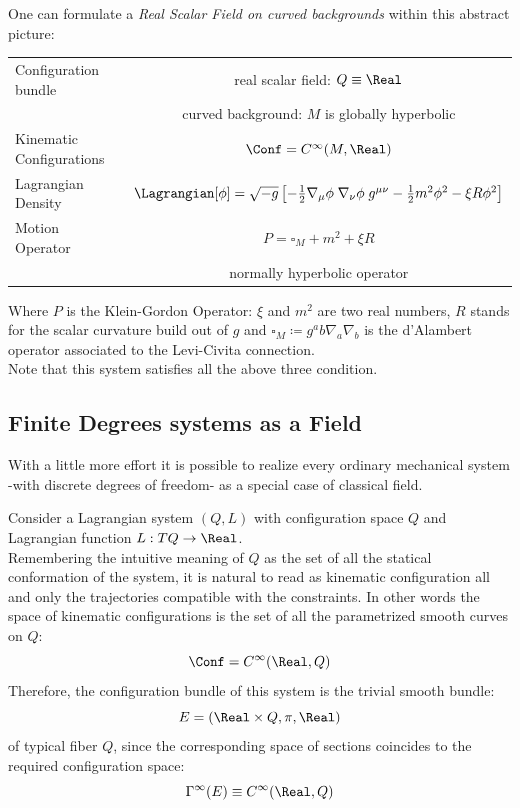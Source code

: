 \documentclass[Main]{subfiles}
\begin{document}
		\begin{example}
		One can formulate a \emph{Real Scalar Field on curved backgrounds} within this abstract picture:
			\begin{center}\begin{tabular}{|l|c|}
			\hline
			Configuration bundle & real scalar field: $Q \equiv \Real$\\
													& curved background: $M$ is globally hyperbolic\\
			\hline
			Kinematic Configurations & $\Conf = C^\infty(M,\Real)$\\
			\hline
			Lagrangian Density &  $\Lagrangian[\phi] = \sqrt{-g} \left[ -\frac{1}{2} \nabla_\mu \phi \; \nabla_\nu \phi \; g^{\mu \nu}  -\frac{1}{2}m^2 \phi^2 -\xi  R \phi^2\right]$ \\
			\hline
			Motion Operator			&  $P=\square_M + m^2 + \xi R$ \\
													& normally hyperbolic operator\\
			\hline
			\end{tabular}\end{center}
			Where $P$ is the Klein-Gordon Operator: $\xi$ and $m^2$ are two real numbers, $R$ stands for the scalar curvature build out of $g$ and $\square_M \coloneqq g^ab \nabla_a \nabla_b$ is the d'Alambert operator associated to the Levi-Civita connection.	
		\\
		Note that this system satisfies all the above three condition.
		\end{example}
	



		\subsection{Finite Degrees systems as a Field}\label{MechanicsAsAField}
			With a little more effort it is possible to realize every ordinary mechanical system  -with discrete degrees of freedom- as a special case of classical field.
			
			Consider a Lagrangian system $(Q, L)$ with configuration space $Q$ and Lagrangian function $L: TQ\rightarrow \Real$.
			\\
			Remembering the intuitive meaning of $Q$ as the set of all the statical conformation of the system, it is natural to read as kinematic configuration all and only the trajectories compatible with the constraints.
			In other words the space of kinematic configurations is the set of all the parametrized smooth curves on $Q$:
			\begin{displaymath}
				\Conf = C^\infty(\Real,Q)
			\end{displaymath}
			Therefore, the configuration bundle of this system is the trivial smooth bundle:
			\begin{displaymath}
				E= ( \Real\times Q, \pi, \Real)
			\end{displaymath}
			of typical fiber $Q$, since the corresponding space of sections coincides to  the required configuration space:
			\begin{displaymath}
				\Gamma^\infty(E) \equiv C^\infty(\Real,Q)
			\end{displaymath}
\end{document}
